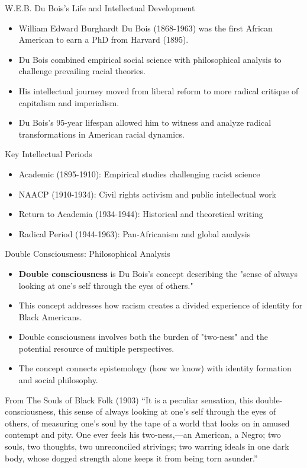 \documentclass{beamer}
\begin{document}
	\begin{frame}{W.E.B. Du Bois's Life and Intellectual Development}
		\begin{itemize}
			\item William Edward Burghardt Du Bois (1868-1963) was the first African American to earn a PhD from Harvard (1895).
			\item Du Bois combined empirical social science with philosophical analysis to challenge prevailing racial theories.
			\item His intellectual journey moved from liberal reform to more radical critique of capitalism and imperialism.
			\item Du Bois's 95-year lifespan allowed him to witness and analyze radical transformations in American racial dynamics.
		\end{itemize}
		
		\begin{alertblock}{Key Intellectual Periods}
			\begin{itemize}
				\item Academic (1895-1910): Empirical studies challenging racist science
				\item NAACP (1910-1934): Civil rights activism and public intellectual work
				\item Return to Academia (1934-1944): Historical and theoretical writing
				\item Radical Period (1944-1963): Pan-Africanism and global analysis
			\end{itemize}
		\end{alertblock}
	\end{frame}
	
	\begin{frame}{Double Consciousness: Philosophical Analysis}
		\begin{itemize}
			\item \textbf{Double consciousness} is Du Bois's concept describing the "sense of always looking at one's self through the eyes of others."
			\item This concept addresses how racism creates a divided experience of identity for Black Americans.
			\item Double consciousness involves both the burden of "two-ness" and the potential resource of multiple perspectives.
			\item The concept connects epistemology (how we know) with identity formation and social philosophy.
		\end{itemize}
		
		\begin{block}{From The Souls of Black Folk (1903)}
			``It is a peculiar sensation, this double-consciousness, this sense of always looking at one’s self through the eyes of others, of measuring one’s soul by the tape of a world that looks on in amused contempt and pity. One ever feels his two-ness,—an American, a Negro; two souls, two thoughts, two unreconciled strivings; two warring ideals in one dark body, whose dogged strength alone keeps it from being torn asunder.''
		\end{block}
	\end{frame}
	
\end{document}
